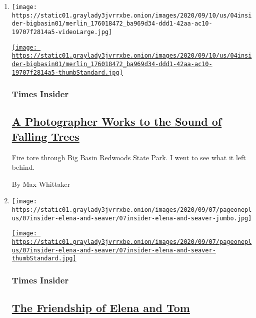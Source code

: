 \begin{enumerate}
\def\labelenumi{\arabic{enumi}.}
\item
  \texttt{[image: https://static01.graylady3jvrrxbe.onion/images/2020/09/10/us/04insider-bigbasin01/merlin\_176018472\_ba969d34-ddd1-42aa-ac10-19707f2814a5-videoLarge.jpg]}

  \href{/2020/09/10/insider/big-basin-fire-photography.html}{\texttt{[image: https://static01.graylady3jvrrxbe.onion/images/2020/09/10/us/04insider-bigbasin01/merlin\_176018472\_ba969d34-ddd1-42aa-ac10-19707f2814a5-thumbStandard.jpg]}}

  \hypertarget{times-insider}{%
  \subsubsection{Times Insider}\label{times-insider}}

  \hypertarget{a-photographer-works-to-the-sound-of-falling-trees}{%
  \subsection{\texorpdfstring{\href{/2020/09/10/insider/big-basin-fire-photography.html}{A
  Photographer Works to the Sound of Falling
  Trees}}{A Photographer Works to the Sound of Falling Trees}}\label{a-photographer-works-to-the-sound-of-falling-trees}}

  Fire tore through Big Basin Redwoods State Park. I went to see what it
  left behind.

  By Max Whittaker
\item
  \texttt{[image: https://static01.graylady3jvrrxbe.onion/images/2020/09/07/pageoneplus/07insider-elena-and-seaver/07insider-elena-and-seaver-jumbo.jpg]}

  \href{/2020/09/07/insider/the-friendship-of-elena-and-tom.html}{\texttt{[image: https://static01.graylady3jvrrxbe.onion/images/2020/09/07/pageoneplus/07insider-elena-and-seaver/07insider-elena-and-seaver-thumbStandard.jpg]}}

  \hypertarget{times-insider-1}{%
  \subsubsection{Times Insider}\label{times-insider-1}}

  \hypertarget{the-friendship-of-elena-and-tom}{%
  \subsection{\texorpdfstring{\href{/2020/09/07/insider/the-friendship-of-elena-and-tom.html}{The
  Friendship of Elena and
  Tom}}{The Friendship of Elena and Tom}}\label{the-friendship-of-elena-and-tom}}


\end{enumerate}
